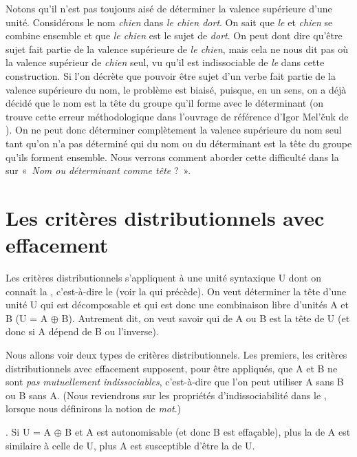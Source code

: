 Notons qu'il n'est pas toujours aisé de déterminer la valence supérieure d'une unité. Considérons le nom \textit{chien} dans \textit{le chien dort}. On sait que \textit{le} et \textit{chien} se combine ensemble et que \textit{le chien} est le sujet de \textit{dort}. On peut dont dire qu'être sujet fait partie de la valence supérieure de \textit{le chien}, mais cela ne nous dit pas où la valence supérieur de \textit{chien} seul, vu qu'il est indissociable de \textit{le} dans cette construction. Si l’on décrète que pouvoir être sujet d’un verbe fait partie de la valence supérieure du nom, le problème est biaisé, puisque, en un sens, on a déjà décidé que le nom est la tête du groupe qu’il forme avec le déterminant (on trouve cette erreur méthodologique dans l’ouvrage de référence d’Igor Mel’čuk de \citeyear{melcuk1988dependency}). On ne peut donc déterminer complètement la valence supérieure du nom seul tant qu'on n'a pas déterminé qui du nom ou du déterminant est la tête du groupe qu'ils forment ensemble. Nous verrons comment aborder cette difficulté dans la  sur «~\textit{Nom ou déterminant comme tête} ?~».

\section{Les critères distributionnels avec effacement}\label{sec:3.3.11}

Les critères distributionnels s’appliquent à une unité syntaxique U dont on connaît la , c’est-à-dire le  (voir la  qui précède).
On veut déterminer la tête d'une unité U qui est décomposable et qui est donc une combinaison libre d'unités A et B (U = A ${\oplus}$ B). Autrement dit, on veut savoir qui de A ou B est la tête de U (et donc si A dépend de B ou l'inverse).

Nous allons voir deux types de critères distributionnels. Les premiers, les critères distributionnels avec effacement supposent, pour être appliqués, que A et B ne sont \textit{pas mutuellement indissociables}, c'est-à-dire que l'on peut utiliser A sans B ou B sans A. (Nous reviendrons sur les propriétés d'indissociabilité dans le  , lorsque nous définirons la notion de \textit{mot}.)

{. Si U = A ${\oplus}$ B et A est autonomisable (et donc B est effaçable), plus la   de A est similaire à celle de U, plus A est susceptible d'être la  de U.}

